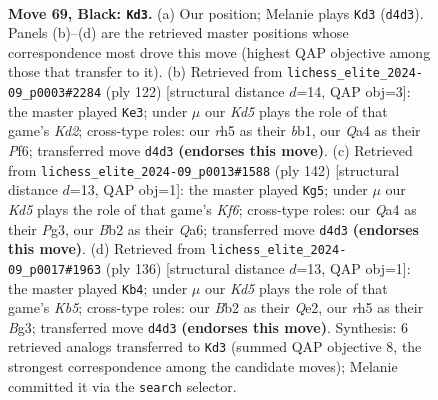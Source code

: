 \documentclass[11pt]{article}
\begin{document}
\clearpage

\begin{figure}[p]\centering
\begin{subfigure}{0.46\textwidth}\centering
\resizebox{\linewidth}{!}{%
\newchessgame
\chessboard[
  setfen={8/8/8/7R/qp1k4/5B2/1b6/6K1 b - - 29 69},
  showmover=false,
  pgfstyle=straightmove, color=movearrow, markmove={d4-d3}
]}
\caption{}
\end{subfigure}\hfill
\begin{subfigure}{0.46\textwidth}\centering
\resizebox{\linewidth}{!}{%
\newchessgame
\chessboard[
  setfen={8/5p2/5P2/B7/8/1k6/3K4/1b6 w - - 3 62},
  showmover=false,
  pgfstyle=straightmove, color=movearrow, markmove={d2-e3}
]}
\caption{}
\end{subfigure}
\\[4pt]
\begin{subfigure}{0.46\textwidth}\centering
\resizebox{\linewidth}{!}{%
\newchessgame
\chessboard[
  setfen={8/8/Q4K2/8/4r3/2k3Pb/8/8 w - - 7 72},
  showmover=false,
  pgfstyle=straightmove, color=movearrow, markmove={f6-g5}
]}
\caption{}
\end{subfigure}\hfill
\begin{subfigure}{0.46\textwidth}\centering
\resizebox{\linewidth}{!}{%
\newchessgame
\chessboard[
  setfen={8/8/8/1K6/3k3P/6B1/4Q3/8 w - - 5 69},
  showmover=false,
  pgfstyle=straightmove, color=movearrow, markmove={b5-b4}
]}
\caption{}
\end{subfigure}
\caption{\textbf{Move 69, Black: \texttt{Kd3}.} (a) Our position; Melanie plays \texttt{Kd3} (\texttt{d4d3}). Panels (b)--(d) are the retrieved master positions whose correspondence most drove this move (highest QAP objective among those that transfer to it). (b) Retrieved from \texttt{lichess\_elite\_2024-09\_p0003\#2284} (ply 122) [structural distance $d$=14, QAP obj=3]: the master played \texttt{Ke3}; under $\mu$ our \emph{Kd5} plays the role of that game's \emph{Kd2}; cross-type roles: our \emph{r}h5 as their \emph{b}b1, our \emph{Q}a4 as their \emph{P}f6; transferred move \texttt{d4d3} \textbf{(endorses this move)}. (c) Retrieved from \texttt{lichess\_elite\_2024-09\_p0013\#1588} (ply 142) [structural distance $d$=13, QAP obj=1]: the master played \texttt{Kg5}; under $\mu$ our \emph{Kd5} plays the role of that game's \emph{Kf6}; cross-type roles: our \emph{Q}a4 as their \emph{P}g3, our \emph{B}b2 as their \emph{Q}a6; transferred move \texttt{d4d3} \textbf{(endorses this move)}. (d) Retrieved from \texttt{lichess\_elite\_2024-09\_p0017\#1963} (ply 136) [structural distance $d$=13, QAP obj=1]: the master played \texttt{Kb4}; under $\mu$ our \emph{Kd5} plays the role of that game's \emph{Kb5}; cross-type roles: our \emph{B}b2 as their \emph{Q}e2, our \emph{r}h5 as their \emph{B}g3; transferred move \texttt{d4d3} \textbf{(endorses this move)}. Synthesis: 6 retrieved analogs transferred to \texttt{Kd3} (summed QAP objective 8, the strongest correspondence among the candidate moves); Melanie committed it via the \texttt{search} selector.}
\label{fig:thought-m137}
\end{figure}
\end{document}
